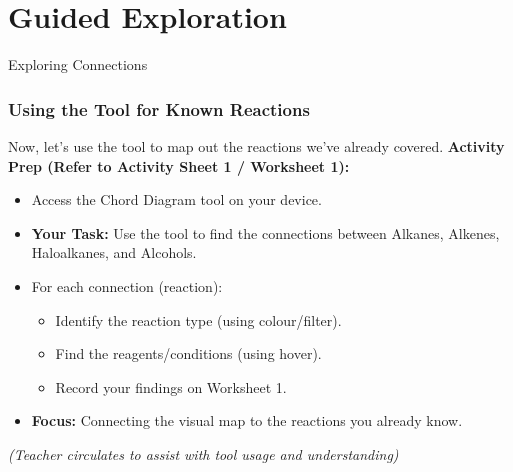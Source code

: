 \documentclass[xcolor=svgnames]{beamer}
\begin{document}
\section{Guided Exploration}
\begin{frame}{Exploring Connections}
    \frametitle{Using the Tool for Known Reactions}
    Now, let's use the tool to map out the reactions we've already covered.
    \vspace{1em}
    \textbf{Activity Prep (Refer to Activity Sheet 1 / Worksheet 1):}
    \begin{itemize}
        \item Access the Chord Diagram tool on your device.
        \item \textbf{Your Task:} Use the tool to find the connections between Alkanes, Alkenes, Haloalkanes, and Alcohols.
        \item For each connection (reaction):
            \begin{itemize}
                \item Identify the reaction type (using colour/filter).
                \item Find the reagents/conditions (using hover).
                \item Record your findings on Worksheet 1.
            \end{itemize}
        \item \textbf{Focus:} Connecting the visual map to the reactions you already know.
    \end{itemize}
    \textit{(Teacher circulates to assist with tool usage and understanding)}
\end{frame}
\end{document}
